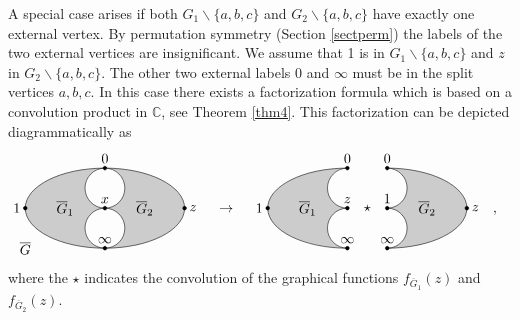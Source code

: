 \documentclass[oneside]{amsart}
\newcommand{\CC}{{\mathbb C}}
\newcommand{\Gg}{{\overline{G}}}
\theoremstyle{plain}
\begin{document}
A special case arises if both $G_1\backslash\{a,b,c\}$ and $G_2\backslash\{a,b,c\}$ have exactly one external vertex. By permutation symmetry (Section \ref{sectperm})
the labels of the two external vertices are insignificant. We assume that 1 is in $G_1\backslash\{a,b,c\}$ and $z$ in $G_2\backslash\{a,b,c\}$. The other two external labels
0 and $\infty$ must be in the split vertices $a,b,c$. In this case there exists a factorization formula which is based on a convolution product in $\CC$, see
Theorem \ref{thm4}. This factorization can be depicted diagrammatically as 
\begin{align}
\label{eqdiaggegenbauer}
\begin{tikzpicture}[baseline={([yshift=-1.3ex]current bounding box.center)}]
    \coordinate[label=above:$0$] (va) at (0,2);
    \coordinate[label=above:$x$] (vb) at (0,1);
    \coordinate[label=above:$\infty$] (vc) at (0,0);
%
    \filldraw (va) circle (1.3pt);
    \filldraw (vb) circle (1.3pt);
    \filldraw (vc) circle (1.3pt);
%
    \draw[fill=black!20] (va) arc (90:270:2 and 1) arc (270:90:.5) arc (270:90:.5);
    \draw[fill=black!20] (va) arc (90:-90:2 and 1) arc (-90:90:.5) arc (-90:90:.5);
%
    \node (G1) at (-1,1) {$\overline{G}_1$};
    \node (G2) at (+1,1) {$\overline{G}_2$};
%
    \node (G) at (-2,0) {$\overline{G}$};
%
    \coordinate[label=left:$1$] (v1)  at ([shift={(vb)}]180:2 and 1);
    \coordinate[label=right:$z$] (vz)  at ([shift={(vb)}]0:2 and 1);
%
    \filldraw (v1) circle (1.3pt);
    \filldraw (vz) circle (1.3pt);
\end{tikzpicture}
\quad
&\rightarrow
\quad
\begin{tikzpicture}[baseline={([yshift=-1.3ex]current bounding box.center)}]
    \coordinate[label=above:$0$] (va) at (0,2);
    \coordinate[label=above:$z$] (vb) at (0,1);
    \coordinate[label=above:$\infty$] (vc) at (0,0);
    \coordinate[label=above:$0$] (wa) at (1,2);
    \coordinate[label=above:$1$] (wb) at (1,1);
    \coordinate[label=above:$\infty$] (wc) at (1,0);
    \coordinate (wa) at (1,2);
    \coordinate (wb) at (1,1);
    \coordinate (wc) at (1,0);
%
    \filldraw (va) circle (1.3pt);
    \filldraw (vb) circle (1.3pt);
    \filldraw (vc) circle (1.3pt);
    \filldraw (wa) circle (1.3pt);
    \filldraw (wb) circle (1.3pt);
    \filldraw (wc) circle (1.3pt);
%
    \draw[fill=black!20] (va) arc (90:270:2 and 1) arc (270:90:.5) arc (270:90:.5);
    \draw[fill=black!20] (wa) arc (90:-90:2 and 1) arc (-90:90:.5) arc (-90:90:.5);
%
    \node (G1) at (-1,1) {$\overline{G}_1$};
    \node (G2) at (+2,1) {$\overline{G}_2$};
%
    \coordinate[label=left:$1$] (v1)  at ([shift={(vb)}]180:2 and 1);
    \coordinate[label=right:$z$] (vz)  at ([shift={(wb)}]0:2 and 1);
%
    \filldraw (v1) circle (1.3pt);
    \filldraw (vz) circle (1.3pt);
%
    \node (t) at (.5,1) {$\star$};
%
    \node (G) at (-2,0) {$\phantom{\overline{G}}$};
\end{tikzpicture}~~,
\end{align}
where the $\star$ indicates the convolution of the graphical functions $f_{\Gg_1}(z)$ and $f_{\Gg_2}(z)$.
\end{document}
